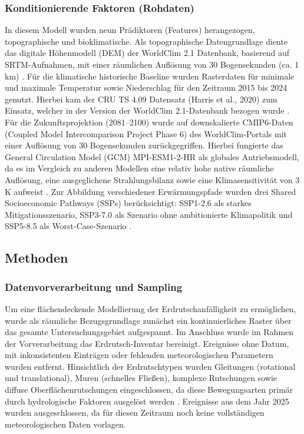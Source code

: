 \documentclass[../main.tex]{subfiles}
\begin{document}
\subsubsection{Konditionierende Faktoren (Rohdaten)}
In diesem Modell wurden neun Prädiktoren (Features) herangezogen, topographische und bioklimatische.
Als topographische Datengrundlage diente das digitale Höhenmodell (DEM) der WorldClim 2.1 Datenbank, basierend auf SRTM-Aufnahmen, mit einer räumlichen Auflösung von 30 Bogensekunden (ca. 1 km) \autocite{fickWorldClim2New2017}.
Für die klimatische historische Baseline wurden Rasterdaten für minimale und maximale Temperatur sowie Niederschlag für den Zeitraum 2015 bis 2024 genutzt. Hierbei kam der CRU TS 4.09 Datensatz (Harris et al., 2020) zum Einsatz, welcher in der Version der WorldClim 2.1-Datenbank bezogen wurde \autocite{fickWorldClim2New2017}.
Für die Zukunftsprojektion (2081--2100) wurde auf downskalierte CMIP6-Daten (Coupled Model Intercomparison Project Phase 6) des WorldClim-Portals mit einer Auflösung von 30 Bogensekunden zurückgegriffen.
Hierbei fungierte das General Circulation Model (GCM) MPI-ESM1-2-HR als globales Antriebsmodell, da es im Vergleich zu anderen Modellen eine relativ hohe native räumliche Auflösung, eine ausgeglichene Strahlungsbilanz sowie eine Klimasensitivität von 3 K aufweist \autocite{anavDynamicalDownscalingCMIP62024}.
Zur Abbildung verschiedener Erwärmungspfade wurden drei Shared Socioeconomic Pathways (SSPs) berücksichtigt: SSP1-2.6 als starkes Mitigationsszenario, SSP3-7.0 als Szenario ohne ambitionierte Klimapolitik und SSP5-8.5 als Worst-Case-Szenario \autocite{oneillScenarioModelIntercomparison2016}.

\subsection{Methoden}

\subsubsection{Datenvorverarbeitung und Sampling}
Um eine flächendeckende Modellierung der Erdrutschanfälligkeit zu ermöglichen, wurde als räumliche Bezugsgrundlage zunächst ein kontinuierliches Raster über das gesamte Untersuchungsgebiet aufgespannt.
Im Anschluss wurde im Rahmen der Vorverarbeitung das Erdrutsch-Inventar bereinigt.
Ereignisse ohne Datum, mit inkonsistenten Einträgen oder fehlenden meteorologischen Parametern wurden entfernt.
Hinsichtlich der Erdrutschtypen wurden Gleitungen (rotational und translational), Muren (schnelles Fließen), komplexe Rutschungen sowie diffuse Oberflächenrutschungen eingeschlossen, da diese Bewegungsarten primär durch hydrologische Faktoren ausgelöst werden \autocite{garianoLandslidesChangingClimate2016}.
Ereignisse aus dem Jahr 2025 wurden ausgeschlossen, da für diesen Zeitraum noch keine vollständigen meteorologischen Daten vorlagen. \\
\end{document}
